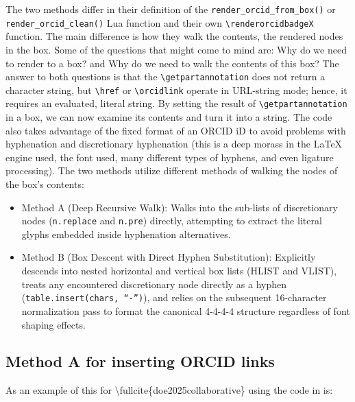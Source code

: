 \documentclass[12pt, twoside]{article}
\begin{document}
The two methods differ in their definition of the \texttt{render\_orcid\_from\_box()} or \texttt{render\_orcid\_clean()} Lua function and their own \texttt{\textbackslash renderorcidbadgeX} function. The main difference is how they walk the contents, \ie the rendered nodes in the box. Some of the questions that might come to mind are: Why do we need to render to a box? and Why do we need to walk the contents of this box? The answer to both questions is that the \texttt{\textbackslash getpartannotation} does not return a character string, but \texttt{\textbackslash href} or \texttt{\textbackslash orcidlink} operate in URL-string mode; hence, it requires an evaluated, literal string. By setting the result of \texttt{\textbackslash getpartannotation} in a box, we can now examine its contents and turn it into a string. The code also takes advantage of the fixed format of an ORCID iD to avoid problems with hyphenation and discretionary hyphenation (this is a deep morass in the \LaTeX{} engine used, the font used, many different types of hyphens, and even ligature processing). The two methods utilize different methods of walking the nodes of the box's contents:
\begin{itemize}
    \item Method A (Deep Recursive Walk): Walks into the sub-lists of discretionary nodes (\texttt{n.replace} and \texttt{n.pre}) directly, attempting to extract the literal glyphs embedded inside hyphenation alternatives.

    \item Method B (Box Descent with Direct Hyphen Substitution): Explicitly descends into nested horizontal and vertical box lists (HLIST and VLIST), treats any encountered discretionary node directly as a hyphen (\texttt{table.insert(chars, \enquote{-})}), and relies on the subsequent 16-character normalization pass to format the canonical 4-4-4-4 structure regardless of font shaping effects.
\end{itemize}


\subsection{Method A for inserting ORCID links}
\label{sec:orcidlinksMethodA}
As an example of this for \textbackslash fullcite\{doe2025collaborative\} using the code in  is:
\newbox\orcidbox

\newcommand*{\renderorcidbadge}[1]{%
\orcidlink{#1}%
}
\end{document}
